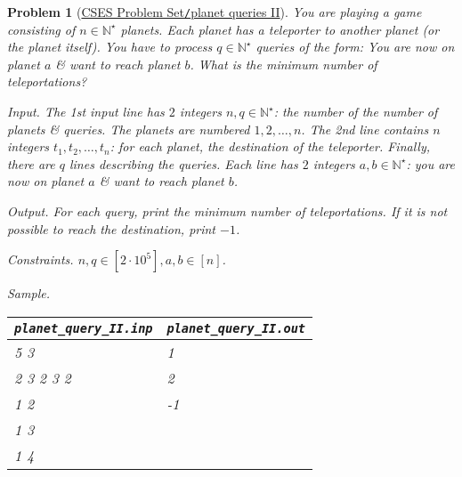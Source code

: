 \documentclass{article}
\newtheorem{problem}{Problem}
\begin{document}
\begin{problem}[\href{https://cses.fi/problemset/task/1160}{CSES Problem Set{\tt/}planet queries II}]
    You are playing a game consisting of $n\in\mathbb{N}^\star$ planets. Each planet has a teleporter to another planet (or the planet itself). You have to process $q\in\mathbb{N}^\star$ queries of the form: You are now on planet $a$ \& want to reach planet $b$. What is the minimum number of teleportations?
    \item {\sf Input.} The 1st input line has $2$ integers $n,q\in\mathbb{N}^\star$: the number of the number of planets \& queries. The planets are numbered $1,2,\ldots,n$. The 2nd line contains $n$ integers $t_1,t_2,\ldots,t_n$: for each planet, the destination of the teleporter. Finally, there are $q$ lines describing the queries. Each line has $2$ integers $a,b\in\mathbb{N}^\star$: you are now on planet $a$ \& want to reach planet $b$.
    \item {\sf Output.} For each query, print the minimum number of teleportations. If it is not possible to reach the destination, print $-1$.
    \item {\sf Constraints.} $n,q\in[2\cdot10^5],a,b\in[n]$.
    \item {\sf Sample.}
    \begin{table}[H]
        \centering
        \begin{tabular}{|l|l|}
            \hline
            \verb|planet_query_II.inp| & \verb|planet_query_II.out| \\
            \hline
            5 3 & 1 \\
            2 3 2 3 2 & 2 \\
            1 2 & -1 \\
            1 3 & \\
            1 4 & \\
            \hline
        \end{tabular}
    \end{table}
\end{problem}
\end{document}
